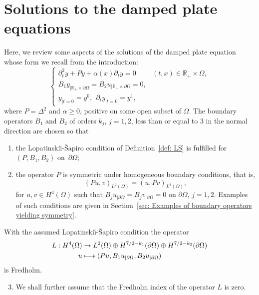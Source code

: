 \documentclass[JEP,XML,SOM,Unicode,published]{cedram}
\newenvironment{enumeratei}
{\bgroup\def\theenumi{\roman{enumi}}\def\theenumii{\arabic{enumii}}\begin{enumerate}}
{\end{enumerate}\egroup}
\newcommand\mto{\mathchoice{\longmapsto}{\mapsto}{\mapsto}{\mapsto}}
\theoremstyle{plain}
\theoremstyle{definition}
\def\R{\mathbb{R}}
\newcommand{\LS}{Lopatinski\u{\i}-\v{S}apiro\xspace}
\newcommand{\inp}[2]{(#1, #2)}
\begin{document}
\section{Solutions to the damped plate equations}
\label{sec: Solutions to the damped plate equations}
Here, we review some aspects of the solutions of the damped plate
equation whose form we recall from the introduction:
\begin{equation}
\label{eq: damped-plate equation}
\begin{cases}
\partial^2_ty +P y+\alpha(x)\partial_t y =0
&(t,x) \in \R_+ \times\Omega,\\
B_1 y_{|\R_+ \times\partial \Omega}= B_2u_{|\R_+ \times\partial \Omega}=0,\\
y_{|t=0}=y^0, \ \ \partial_t y_{|t=0}=y^1,
\end{cases}
\end{equation}
where $P = \Delta^2$ and $\alpha\geq 0$, positive on some open subset
of $\Omega$. The boundary operators $B_1$
and $B_2$ of orders $k_j$, $j=1,2$, less than or equal to $3$ in the normal direction are chosen so that
\begin{enumeratei}
\item
the \LS condition of Definition~\ref{def: LS} is fulfilled for $(P,
B_1, B_2)$ on~$\partial\Omega$;
\item
the operator $P$ is symmetric under homogeneous boundary
conditions, that is,
\begin{equation}
\label{eq: symmetry property}
\inp{Pu }{v}_{L^2(\Omega)} = \inp{u}{P v}_{L^2(\Omega)},
\end{equation}
for $u, v \in H^4(\Omega)$ such that $B_j u_{|\partial \Omega} = B_j v_{|\partial \Omega} =
0$ on $\partial\Omega$, $j=1,2$. Examples of such conditions are
given in Section~\ref{sec: Examples of boundary operators yielding symmetry}.
\end{enumeratei}
With the assumed \LS condition the operator
\begin{align}
\label{eq: Fredholm operator}
L: H^4 (\Omega) &\to L^2(\Omega) \oplus H^{7/2-k_1} (\partial \Omega)
\oplus H^{7/2-k_2} (\partial \Omega) \notag\\
u & \mto (Pu, B_1 u_{|\partial \Omega} , B_2 u_{|\partial \Omega})
\end{align}
is Fredholm.

\begin{enumeratei}\setcounter{enumi}{2}
\item
We shall further assume that the Fredholm index of the operator $L$ is zero.
\end{enumeratei}
\end{document}
